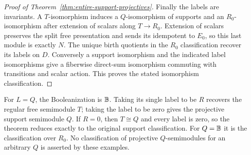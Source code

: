 \begin{proof}[Proof of Theorem~\ref{thm:entire-support-projectives}]
Finally the labels are invariants. A $T$-isomorphism induces a
$Q$-isomorphism of supports and an $R_0$-isomorphism after extension
of scalars along $T\to R_0$. Extension of scalars preserves the
split free presentation and sends its idempotent to $E_0$, so this
last module is exactly $N$. The unique birth quotients in the
$R_0$ classification recover its labels on $D$. Conversely a
support isomorphism and the indicated label isomorphisms give a
fiberwise direct-sum isomorphism commuting with transitions and
scalar action. This proves the stated isomorphism classification.
\end{proof}

For $L=Q$, the Booleanization is $\mathbb B$. Taking its single label to be
$R$ recovers the regular free semimodule $T$; taking the label to be
zero gives the projective support semimodule $Q$. If $R=0$, then
$T\cong Q$ and every label is zero, so the theorem reduces exactly
to the original support classification. For $Q=\mathbb B$ it is the
classification over $R_0$. No classification of projective
$Q$-semimodules for an arbitrary $Q$ is asserted by these examples.
